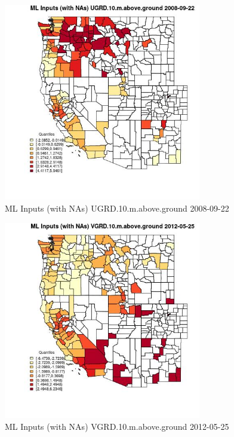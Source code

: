 \begin{figure} 
\centering  
\includegraphics[width=0.77\textwidth]{Code_Outputs/Report_ML_input_PM25_Step4_part_e_de_duplicated_aves_compiled_2019-05-18wNAs_CountyUGRD10mabovegroundMean2008-09-22_2008-09-22.jpg} 
\caption{\label{fig:Report_ML_input_PM25_Step4_part_e_de_duplicated_aves_compiled_2019-05-18wNAsCountyUGRD10mabovegroundMean2008-09-22_2008-09-22}ML Inputs (with NAs) UGRD.10.m.above.ground 2008-09-22} 
\end{figure} 
 

\begin{figure} 
\centering  
\includegraphics[width=0.77\textwidth]{Code_Outputs/Report_ML_input_PM25_Step4_part_e_de_duplicated_aves_compiled_2019-05-18wNAs_CountyVGRD10mabovegroundMean2012-05-25_2012-05-25.jpg} 
\caption{\label{fig:Report_ML_input_PM25_Step4_part_e_de_duplicated_aves_compiled_2019-05-18wNAsCountyVGRD10mabovegroundMean2012-05-25_2012-05-25}ML Inputs (with NAs) VGRD.10.m.above.ground 2012-05-25} 
\end{figure} 
 

